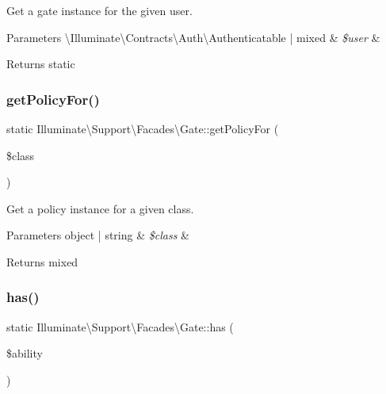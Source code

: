 Get a gate instance for the given user.


\begin{DoxyParams}[1]{Parameters}
\textbackslash{}\+Illuminate\textbackslash{}\+Contracts\textbackslash{}\+Auth\textbackslash{}\+Authenticatable | mixed & {\em \$user} & \\
\hline
\end{DoxyParams}
\begin{DoxyReturn}{Returns}
static 
\end{DoxyReturn}
\mbox{\label{class_illuminate_1_1_support_1_1_facades_1_1_gate_a7c55d413c035d9f7c98f1c232af55b0a}} 
\subsubsection{\texorpdfstring{get\+Policy\+For()}{getPolicyFor()}}
{\footnotesize\ttfamily static Illuminate\textbackslash{}\+Support\textbackslash{}\+Facades\textbackslash{}\+Gate\+::get\+Policy\+For (\begin{DoxyParamCaption}\item[{}]{\$class }\end{DoxyParamCaption})\hspace{0.3cm}{\ttfamily [static]}}

Get a policy instance for a given class.


\begin{DoxyParams}[1]{Parameters}
object | string & {\em \$class} & \\
\hline
\end{DoxyParams}
\begin{DoxyReturn}{Returns}
mixed 
\end{DoxyReturn}
\mbox{\label{class_illuminate_1_1_support_1_1_facades_1_1_gate_a707cb199ec72119e5b85c25ad235004e}} 
\subsubsection{\texorpdfstring{has()}{has()}}
{\footnotesize\ttfamily static Illuminate\textbackslash{}\+Support\textbackslash{}\+Facades\textbackslash{}\+Gate\+::has (\begin{DoxyParamCaption}\item[{}]{\$ability }\end{DoxyParamCaption})\hspace{0.3cm}{\ttfamily [static]}}

